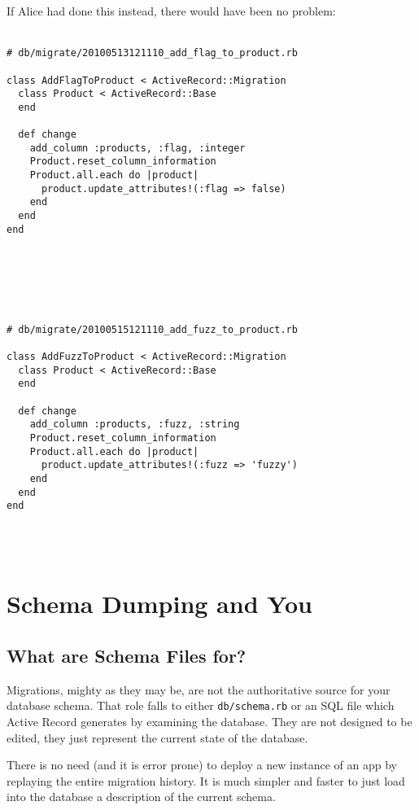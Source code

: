 \documentclass[10pt]{book}
\begin{document}
If Alice had done this instead, there would have been no problem:
\\ \\
\begin{minipage}{\textwidth}
\begin{verbatim}
# db/migrate/20100513121110_add_flag_to_product.rb
 
class AddFlagToProduct < ActiveRecord::Migration
  class Product < ActiveRecord::Base
  end
 
  def change
    add_column :products, :flag, :integer
    Product.reset_column_information
    Product.all.each do |product|
      product.update_attributes!(:flag => false)
    end
  end
end
\end{verbatim}
\end{minipage}
\\ \\
\\ \\
\begin{minipage}{\textwidth}
\begin{verbatim}
# db/migrate/20100515121110_add_fuzz_to_product.rb
 
class AddFuzzToProduct < ActiveRecord::Migration
  class Product < ActiveRecord::Base
  end
 
  def change
    add_column :products, :fuzz, :string
    Product.reset_column_information
    Product.all.each do |product|
      product.update_attributes!(:fuzz => 'fuzzy')
    end
  end
end
\end{verbatim}
\end{minipage}
\\ \\


\section{ Schema Dumping and You}

\subsection{ What are Schema Files for?}

Migrations, mighty as they may be, are not the authoritative source for your database schema. That role falls to either \texttt{db/schema.rb} or an SQL file which Active Record generates by examining the database. They are not designed to be edited, they just represent the current state of the database.

There is no need (and it is error prone) to deploy a new instance of an app by replaying the entire migration history. It is much simpler and faster to just load into the database a description of the current schema.
\end{document}
